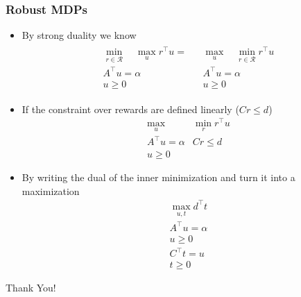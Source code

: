 \documentclass[aspectratio=169]{beamer}
\begin{document}
\begin{frame}
	\frametitle{Robust MDPs}
	\begin{itemize}
		\item By strong duality we know
		\[
			\begin{matrix}
			
				\begin{matrix}
					\min \limits_{r \in \mathcal{R}} \quad \max \limits_u r^\top u  = \\
					A^\top u = \alpha \\
					u \geq 0
				\end{matrix}
				& 
				\begin{matrix}
					\max \limits_u \quad \min \limits_{r \in \mathcal{R}} r^\top u \\
					A^\top u = \alpha \\
					u \geq 0
				\end{matrix}
			\end{matrix}
		\]
		\item If the constraint over rewards are defined linearly ($Cr \leq d$)
		\[
			\begin{matrix}
				\max \limits_u & \min \limits_{r} r^\top u \\
				A^\top u = \alpha  & Cr \leq d\\
				u \geq 0
			\end{matrix}
		\]
		\item By writing the dual of the inner minimization and turn it into a maximization
		\[
			\begin{matrix}
				\max \limits_{u,t} d^\top t\\
				A^\top u = \alpha \\
				u \geq 0 \\
				C^\top t = u \\
				t \geq 0
			\end{matrix}
		\]
	\end{itemize}
\end{frame}

\begin{frame}
	\begin{center}
		\Huge Thank You!
	\end{center}
\end{frame}


\end{document}
